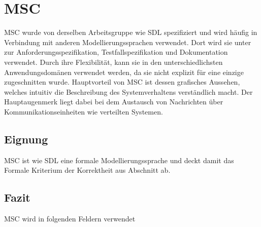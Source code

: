 \section{MSC}
\label{sc:MSCB}
\ac{MSC} wurde von derselben Arbeitsgruppe wie \ac{SDL} spezifiziert und wird häufig in Verbindung mit anderen Modellierungssprachen verwendet. Dort wird sie unter zur Anforderungsspezifikation, Testfallspezifikation und Dokumentation verwendet. Durch ihre Flexibilität, kann sie in den unterschiedlichsten Anwendungsdomänen verwendet werden, da sie nicht explizit für eine einzige zugeschnitten wurde. Hauptvorteil von \ac{MSC} ist dessen grafisches Aussehen, welches intuitiv die Beschreibung des Systemverhaltens verständlich macht. Der Hauptaugenmerk liegt dabei bei dem Austausch von Nachrichten über Kommunikationseinheiten wie verteilten Systemen.
\subsection{Eignung}
\label{sc:MSCEignung}
\ac{MSC} ist wie \ac{SDL} eine formale Modellierungssprache und deckt damit das Formale Kriterium der Korrektheit aus Abschnitt \pageref{ssc:Korrektheit} ab. 

\subsection{Fazit}
\label{sc:MSCFazit}


MSC wird in folgenden Feldern verwendet
